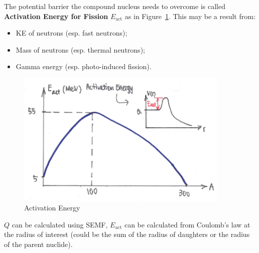 \documentclass{school-22.101-notes}
\begin{document}
The potential barrier the compound nucleus needs to overcome is called \textbf{Activation Energy for Fission} $E_{\mathrm{act}}$ as in Figure~\ref{activation-energy}. This may be a result from:
\begin{itemize}
\item KE of neutrons (esp. fast neutrons);
\item Mass of neutrons (esp. thermal neutrons);
\item Gamma energy (esp. photo-induced fission).
\end{itemize}
\begin{figure}
   \centering
   \includegraphics[width=4in]{images/ni/activation-energy.png}
   \caption{Activation Energy\label{activation-energy}}
\end{figure}
$Q$ can be calculated using SEMF, $E_{\mathrm{act}}$ can be calculated from Coulomb's law at the radius of interest (could be the sum of the radius of daughters or the radius of the parent nuclide). 
\end{document}
